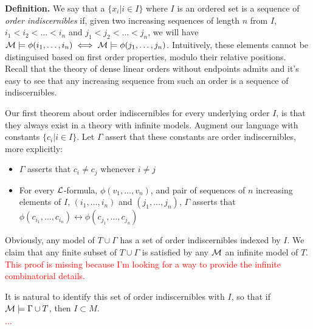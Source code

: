 \textbf{Definition.} We say that a \(\{x_i | i \in I\}\) where \(I\) is an ordered set is a sequence of \textit{order indiscernibles} if, given two increasing sequences of length \(n\) from \(I\), 
\(i_1 < i_2 < \ldots < i_n\) and \(j_1 < j_2 < \ldots < j_n\), we will have \(\mathcal{M} \models \phi(i_1, \ldots, i_n) \iff \mathcal{M} \models \phi(j_1, \ldots, j_n)\). 
Intuitively, these elements cannot be distinguised based on first order properties, modulo their relative positions.  
Recall that the theory of dense linear orders without endpoints admits \qe and it's easy to see that any increasing sequence from such an order is a sequence of indiscernibles. 


Our first theorem about order indiscernibles for every underlying order \(I\), is that they always exist in a theory with infinite models. 
Augment our language with constants \(\{c_i | i \in I\}\).
Let \(\Gamma\) assert that these constants are order indiscernibles, more explicitly:
\begin{itemize}
\item \(\Gamma\) asserts that \(c_i \neq c_j\) whenever \(i \neq j\)
\item For every \(\mathcal{L}\)-formula, \(\phi(v_1, \ldots, v_n)\), and pair of sequences of \(n\) increasing elements of \(I\), \((i_1, \ldots, i_n)\) and \((j_1, \ldots, j_n)\), \(\Gamma\) asserts that \(\phi(c_{i_1}, \ldots, c_{i_n}) \leftrightarrow \phi(c_{j_1}, \ldots, c_{j_n})\)
\end{itemize}

Obviously, any model of \(T \cup \Gamma\) has a set of order indiscernibles indexed by \(I\). 
We claim that any finite subset of \(T \cup \Gamma\) is satisfied by any \(\mathcal{M}\) an infinite model of \(T\). 
\textcolor{red}{This proof is missing because I'm looking for a way to provide the infinite combinatorial details.}

It is natural to identify this set of order indiscernibles with \(I\), so that if \(\mathcal{M} \models \Gamma \cup T\), then \(I \subset M\).

\textcolor{red}{\(\ldots\)}

